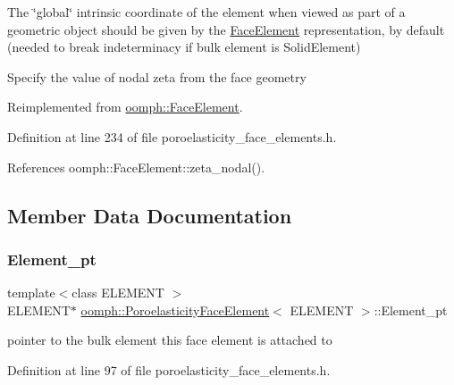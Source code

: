 The \char`\"{}global\char`\"{} intrinsic coordinate of the element when viewed as part of a geometric object should be given by the \hyperlink{classoomph_1_1FaceElement}{Face\+Element} representation, by default (needed to break indeterminacy if bulk element is Solid\+Element) 

Specify the value of nodal zeta from the face geometry 

Reimplemented from \hyperlink{classoomph_1_1FaceElement_a58c9f93705c7741f76c8487d152e68a6}{oomph\+::\+Face\+Element}.



Definition at line 234 of file poroelasticity\+\_\+face\+\_\+elements.\+h.



References oomph\+::\+Face\+Element\+::zeta\+\_\+nodal().



\subsection{Member Data Documentation}
\mbox{\label{classoomph_1_1PoroelasticityFaceElement_abc3e4d3ab29b19432676b25962b7994d}} 
\subsubsection{\texorpdfstring{Element\+\_\+pt}{Element\_pt}}
{\footnotesize\ttfamily template$<$class E\+L\+E\+M\+E\+NT $>$ \\
E\+L\+E\+M\+E\+NT$\ast$ \hyperlink{classoomph_1_1PoroelasticityFaceElement}{oomph\+::\+Poroelasticity\+Face\+Element}$<$ E\+L\+E\+M\+E\+NT $>$\+::Element\+\_\+pt\hspace{0.3cm}{\ttfamily [protected]}}



pointer to the bulk element this face element is attached to 



Definition at line 97 of file poroelasticity\+\_\+face\+\_\+elements.\+h.

\mbox{\label{classoomph_1_1PoroelasticityFaceElement_afbc70ad45cf51317cee1134237daf962}} 

